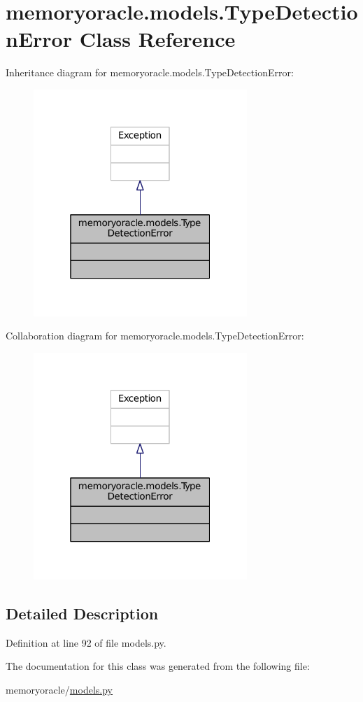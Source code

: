 \hypertarget{classmemoryoracle_1_1models_1_1TypeDetectionError}{}\section{memoryoracle.\+models.\+Type\+Detection\+Error Class Reference}
\label{classmemoryoracle_1_1models_1_1TypeDetectionError}


Inheritance diagram for memoryoracle.\+models.\+Type\+Detection\+Error\+:
\nopagebreak
\begin{figure}[H]
\begin{center}
\leavevmode
\includegraphics[width=229pt]{classmemoryoracle_1_1models_1_1TypeDetectionError__inherit__graph}
\end{center}
\end{figure}


Collaboration diagram for memoryoracle.\+models.\+Type\+Detection\+Error\+:
\nopagebreak
\begin{figure}[H]
\begin{center}
\leavevmode
\includegraphics[width=229pt]{classmemoryoracle_1_1models_1_1TypeDetectionError__coll__graph}
\end{center}
\end{figure}


\subsection{Detailed Description}


Definition at line 92 of file models.\+py.



The documentation for this class was generated from the following file\+:\begin{DoxyCompactItemize}
\item 
memoryoracle/\hyperlink{models_8py}{models.\+py}\end{DoxyCompactItemize}

